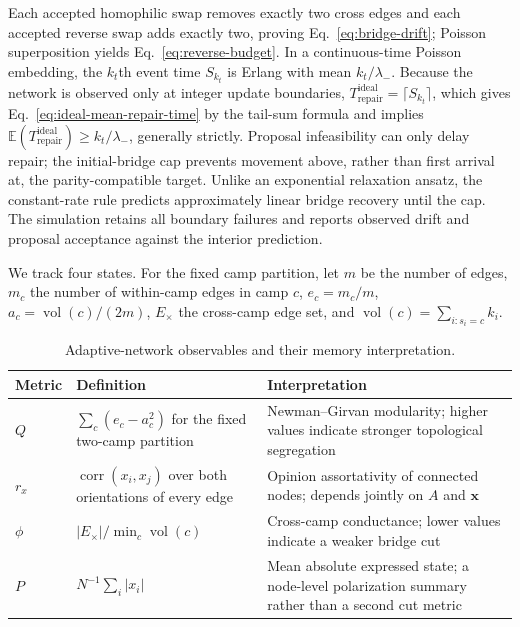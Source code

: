 \documentclass[pdflatex,sn-mathphys-num]{sn-jnl}
\newcommand{\E}{\mathbb{E}}
\begin{document}
Each accepted homophilic swap removes exactly two cross edges and each accepted reverse swap adds exactly two, proving Eq.~\eqref{eq:bridge-drift}; Poisson superposition yields Eq.~\eqref{eq:reverse-budget}. In a continuous-time Poisson embedding, the $k_t$th event time $S_{k_t}$ is Erlang with mean $k_t/\lambda_-$. Because the network is observed only at integer update boundaries, $T_{\mathrm{repair}}^{\mathrm{ideal}}=\lceil S_{k_t}\rceil$, which gives Eq.~\eqref{eq:ideal-mean-repair-time} by the tail-sum formula and implies $\E(T_{\mathrm{repair}}^{\mathrm{ideal}})\geq k_t/\lambda_-$, generally strictly. Proposal infeasibility can only delay repair; the initial-bridge cap prevents movement above, rather than first arrival at, the parity-compatible target. Unlike an exponential relaxation ansatz, the constant-rate rule predicts approximately linear bridge recovery until the cap. The simulation retains all boundary failures and reports observed drift and proposal acceptance against the interior prediction.

We track four states. For the fixed camp partition, let $m$ be the number of edges, $m_c$ the number of within-camp edges in camp $c$, $e_c=m_c/m$, $a_c=\operatorname{vol}(c)/(2m)$, $E_\times$ the cross-camp edge set, and $\operatorname{vol}(c)=\sum_{i:s_i=c}k_i$.
\begin{table}[!htbp]
\centering
\caption{Adaptive-network observables and their memory interpretation.}
\label{tab:network-metrics}
\small
\begin{tabularx}{\textwidth}{|p{1.2cm}|p{4.1cm}|Y|}
\hline
\textbf{Metric} & \textbf{Definition} & \textbf{Interpretation}\\
\hline
$Q$ & $\sum_c(e_c-a_c^2)$ for the fixed two-camp partition & Newman--Girvan modularity; higher values indicate stronger topological segregation\\
\hline
$r_x$ & $\operatorname{corr}(x_i,x_j)$ over both orientations of every edge & Opinion assortativity of connected nodes; depends jointly on $A$ and $\bm x$\\
\hline
$\phi$ & $|E_\times|/\min_c\operatorname{vol}(c)$ & Cross-camp conductance; lower values indicate a weaker bridge cut\\
\hline
$P$ & $N^{-1}\sum_i|x_i|$ & Mean absolute expressed state; a node-level polarization summary rather than a second cut metric\\
\hline
\end{tabularx}
\end{table}
\end{document}
